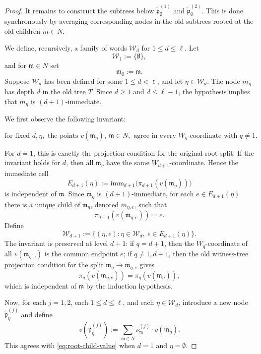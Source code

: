 \documentclass[10pt,a4paper]{amsart}
\newcommand{\fm}{\mathfrak{m}}
\newcommand{\fp}{\mathfrak{p}}
\let\geq\geqslant
\providecommand{\imm}[0]{\ensuremath{\mathrm{imm}}\xspace}
\let\leq\leqslant
\let\geq\geqslant
\begin{document}
\begin{proof}
It remains to construct the subtrees below
$\widetilde{\fp}^{(1)}_{\emptyset}$ and $\widetilde{\fp}^{(2)}_{\emptyset}$.  This is done
synchronously by averaging corresponding nodes in the old subtrees
rooted at the old children $m\in N$.

We define, recursively, a family of words $\mathcal W_d$ for
$1\leq d\leq \ell$.  Let
\[
  \mathcal W_1:=\{\emptyset\},
\]
and for $\fm\in N$ set
\[
  \fm_{\emptyset}:=\fm.
\]
Suppose $\mathcal W_d$ has been defined for some $1\leq d<\ell$, and
let $\eta\in\mathcal W_d$.  The node $m_\eta$ has depth $d$ in the
old tree $T$.  Since $d\geq 1$ and $d\leq \ell-1$, the hypothesis
implies that $m_\eta$ is $(d+1)$-immediate.

We first observe the following invariant:

\[
  \text{for fixed }d,\eta,\text{ the points }v(\fm_\eta),\ \fm\in N,
  \text{ agree in every }W_q\text{-coordinate with }q\neq 1.
\]

For $d=1$, this is exactly the projection condition for the original
root split.  If the invariant holds for $d$, then all $\fm_\eta$ have
the same $W_{d+1}$-coordinate.  Hence the immediate cell
\[
  E_{d+1}(\eta):=
  \imm_{d+1}\bigl(\pi_{d+1}(v(\fm_\eta))\bigr)
\]
is independent of $\fm$.  Since $\fm_\eta$ is $(d+1)$-immediate, for each
$e\in E_{d+1}(\eta)$ there is a unique child of $\fm_\eta$, denoted
$m_{\eta,e}$, such that
\[
  \pi_{d+1}(v(\fm_{\eta,e}))=e.
\]
Define
\[
  \mathcal W_{d+1}
  :=
  \{(\eta,e):\eta\in\mathcal W_d,\ e\in E_{d+1}(\eta)\}.
\]
The invariant is preserved at level $d+1$: if $q=d+1$, then the
$W_q$-coordinate of all $v(\fm_{\eta,e})$ is the common endpoint $e$;
if $q\neq 1,d+1$, then the old witness-tree projection condition for
the split $\fm_\eta\to \fm_{\eta,e}$ gives
\[
  \pi_q(v(\fm_{\eta,e}))=\pi_q(v(\fm_\eta)),
\]
which is independent of $\fm$ by the induction hypothesis.

Now, for each $j=1,2$, each $1\leq d\leq \ell$, and each
$\eta\in\mathcal W_d$, introduce a new node $\widetilde{\fp}^{(j)}_\eta$ and define
\begin{equation}\label{eq:z-def}
  v(\widetilde{\fp}^{(j)}_\eta)
  :=
  \sum_{\fm\in N}\nu_\fm^{(j)}\cdot v(\fm_\eta).
\end{equation}
This agrees with \eqref{eq:root-child-value} when $d=1$ and
$\eta=\emptyset$.


\end{proof}
\end{document}

